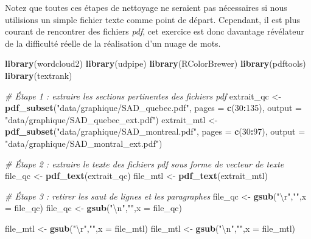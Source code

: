 \documentclass[
  11pt,
  french,
]{book}
\makeatletter
\newenvironment{Shaded}{\begin{snugshade}}{\end{snugshade}}
\newcommand{\CharTok}[1]{\textcolor[rgb]{0.31,0.60,0.02}{#1}}
\newcommand{\CommentTok}[1]{\textcolor[rgb]{0.56,0.35,0.01}{\textit{#1}}}
\newcommand{\DataTypeTok}[1]{\textcolor[rgb]{0.13,0.29,0.53}{#1}}
\newcommand{\DecValTok}[1]{\textcolor[rgb]{0.00,0.00,0.81}{#1}}
\newcommand{\KeywordTok}[1]{\textcolor[rgb]{0.13,0.29,0.53}{\textbf{#1}}}
\newcommand{\NormalTok}[1]{#1}
\newcommand{\OperatorTok}[1]{\textcolor[rgb]{0.81,0.36,0.00}{\textbf{#1}}}
\newcommand{\StringTok}[1]{\textcolor[rgb]{0.31,0.60,0.02}{#1}}
\newenvironment{kframe}{%
\medskip{}
\setlength{\fboxsep}{.8em}
 \def\at@end@of@kframe{}%
 \ifinner\ifhmode%
  \def\at@end@of@kframe{\end{minipage}}%
  \begin{minipage}{\columnwidth}%
 \fi\fi%
 \def\FrameCommand##1{\hskip\@totalleftmargin \hskip-\fboxsep
 \colorbox{shadecolor}{##1}\hskip-\fboxsep
     \hskip-\linewidth \hskip-\@totalleftmargin \hskip\columnwidth}%
 \MakeFramed {\advance\hsize-\width
   \@totalleftmargin\z@ \linewidth\hsize
   \@setminipage}}%
 {\par\unskip\endMakeFramed%
 \at@end@of@kframe}
\renewenvironment{Shaded}{\begin{kframe}}{\end{kframe}}
\makeatother
\begin{document}
Notez que toutes ces étapes de nettoyage ne seraient pas nécessaires si nous utilisions un simple fichier texte comme point de départ. Cependant, il est plus courant de rencontrer des fichiers \emph{pdf}, cet exercice est donc davantage révélateur de la difficulté réelle de la réalisation d'un nuage de mots.

\begin{Shaded}
\begin{Highlighting}[]
\KeywordTok{library}\NormalTok{(wordcloud2)}
\KeywordTok{library}\NormalTok{(udpipe)}
\KeywordTok{library}\NormalTok{(RColorBrewer)}
\KeywordTok{library}\NormalTok{(pdftools)}
\KeywordTok{library}\NormalTok{(textrank)}

\CommentTok{# Étape 1 : extraire les sections pertinentes des fichiers pdf}
\NormalTok{extrait_qc <-}\StringTok{ }\KeywordTok{pdf_subset}\NormalTok{(}\StringTok{"data/graphique/SAD_quebec.pdf"}\NormalTok{, }\DataTypeTok{pages =} \KeywordTok{c}\NormalTok{(}\DecValTok{30}\OperatorTok{:}\DecValTok{135}\NormalTok{),}
                         \DataTypeTok{output =} \StringTok{"data/graphique/SAD_quebec_ext.pdf"}\NormalTok{)}
\NormalTok{extrait_mtl <-}\StringTok{ }\KeywordTok{pdf_subset}\NormalTok{(}\StringTok{"data/graphique/SAD_montreal.pdf"}\NormalTok{, }\DataTypeTok{pages =} \KeywordTok{c}\NormalTok{(}\DecValTok{30}\OperatorTok{:}\DecValTok{97}\NormalTok{),}
                          \DataTypeTok{output =} \StringTok{"data/graphique/SAD_montral_ext.pdf"}\NormalTok{)}

\CommentTok{# Étape 2 : extraire le texte des fichiers pdf sous forme de vecteur de texte}
\NormalTok{file_qc <-}\StringTok{ }\KeywordTok{pdf_text}\NormalTok{(extrait_qc)}
\NormalTok{file_mtl <-}\StringTok{ }\KeywordTok{pdf_text}\NormalTok{(extrait_mtl)}

\CommentTok{# Étape 3 : retirer les saut de lignes et les paragraphes}
\NormalTok{file_qc <-}\StringTok{ }\KeywordTok{gsub}\NormalTok{(}\StringTok{"}\CharTok{\textbackslash{}r}\StringTok{"}\NormalTok{,}\StringTok{""}\NormalTok{,}\DataTypeTok{x =}\NormalTok{ file_qc)}
\NormalTok{file_qc <-}\StringTok{ }\KeywordTok{gsub}\NormalTok{(}\StringTok{"}\CharTok{\textbackslash{}n}\StringTok{"}\NormalTok{,}\StringTok{""}\NormalTok{,}\DataTypeTok{x =}\NormalTok{ file_qc)}

\NormalTok{file_mtl <-}\StringTok{ }\KeywordTok{gsub}\NormalTok{(}\StringTok{"}\CharTok{\textbackslash{}r}\StringTok{"}\NormalTok{,}\StringTok{""}\NormalTok{,}\DataTypeTok{x =}\NormalTok{ file_mtl)}
\NormalTok{file_mtl <-}\StringTok{ }\KeywordTok{gsub}\NormalTok{(}\StringTok{"}\CharTok{\textbackslash{}n}\StringTok{"}\NormalTok{,}\StringTok{""}\NormalTok{,}\DataTypeTok{x =}\NormalTok{ file_mtl)}


\end{Highlighting}
\end{Shaded}
\end{document}
